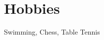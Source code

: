 \section{Hobbies}
\resumeSubHeadingListStart
{\item{Swimming, Chess, Table Tennis}}
\resumeSubHeadingListEnd
